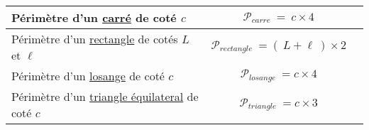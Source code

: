 \documentclass[11pt]{article}
\begin{document}
\begin{exemple} {\large
  \begin{center}
  \begin{tabular}{|l|c|c|}
\hline
Périmètre d'un \underline{carré} de coté $c$ &  $\mathcal{P}_{carre}~=~c \times 4$ \\ \hline
Périmètre d'un \underline{rectangle} de cotés $L$ et $\ell$ &  $\mathcal{P}_{rectangle}~=(~L+\ell~) \times 2$ \\ \hline
Périmètre d'un \underline{losange} de coté $c$ &  $\mathcal{P}_{losange}~=c \times 4$ \\ \hline
Périmètre d'un \underline{triangle équilateral} de coté $c$ \phantom{00} &  $\mathcal{P}_{triangle}~=c \times 3$ \\ \hline
\end{tabular} 
\end{center} }
\end{exemple}
\end{document}
